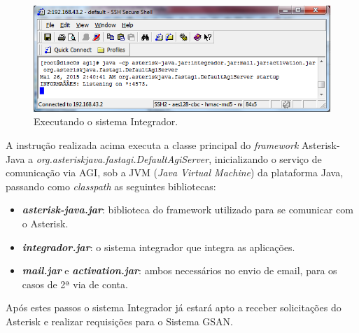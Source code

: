\begin{figure}[!htb]
	\centering
	\caption{Executando o sistema Integrador.}	
	\label{figura:executarIntegrador}
	\includegraphics{figuras/executar_integrador.png}
\end{figure}


A instrução realizada acima executa a classe principal do \textit{framework} Asterisk-Java a \textit{ org.asteriskjava.fastagi.DefaultAgiServer}, inicializando o serviço de comunicação via AGI, sob a JVM (\textit{Java Virtual Machine}) da plataforma Java, passando como \textit{classpath} as seguintes bibliotecas: 

\begin{itemize}
	\item \textbf{\textit{asterisk-java.jar}}: biblioteca do framework utilizado para se comunicar com o Asterisk.
	\item \textbf{\textit{integrador.jar}}: o sistema integrador que integra as aplicações.
	\item \textbf{\textit{mail.jar}} e \textbf{\textit{activation.jar}}: ambos necessários no envio de email, para os casos de 2ª via de conta.	
\end{itemize}

Após estes passos o sistema Integrador já estará apto a receber solicitações do Asterisk e realizar requisições para o Sistema GSAN.